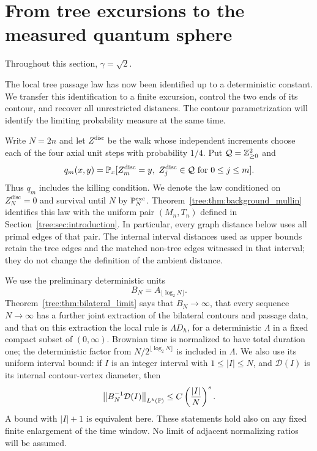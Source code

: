 \section{From tree excursions to the measured quantum sphere}
\label{tree:sec:sphere}

Throughout this section, $\gamma=\sqrt2$.

The local tree passage law has now been identified up to a deterministic
constant. We transfer this identification to a finite excursion, control
the two ends of its contour, and recover all unrestricted distances.
The contour parametrization will identify the limiting probability
measure at the same time.

Write $N=2n$ and let $Z^{\mathrm{disc}}$ be the walk whose independent
increments choose each of the four axial unit steps with probability
$1/4$.  Put $\mathcal Q=\mathbb Z_{\geq0}^2$ and
\[
 q_m(x,y)=\Prob_x[Z^{\mathrm{disc}}_m=y,\ Z^{\mathrm{disc}}_j\in\mathcal Q
                    \text{ for }0\leq j\leq m].
\]
Thus $q_m$ includes the killing condition.  We denote the law conditioned on
$Z^{\mathrm{disc}}_N=0$ and survival until $N$ by $\mathbb P_N^{\mathrm{exc}}$.
Theorem~\ref{tree:thm:background_mullin} identifies this law with the uniform pair
$(M_n,T_n)$ defined in Section~\ref{tree:sec:introduction}.  In particular,
every graph distance below uses all primal
edges of that pair.  The internal interval distances used as upper bounds
retain the tree edges and the matched non-tree edges witnessed in that
interval; they do not change the definition of the ambient distance.

We use the preliminary deterministic units
\begin{equation}\label{tree:eq:sphere_units}
 B_N=A_{\lfloor\log_2N\rfloor}.
\end{equation}
Theorem~\ref{tree:thm:bilateral_limit} says that $B_N\to\infty$, that every
sequence $N\to\infty$ has a further joint extraction of the bilateral
contours and passage data, and that on this extraction the local rule is
$\Lambda D_h$, for a deterministic $\Lambda$ in a fixed compact subset of
$(0,\infty)$.  Brownian time is normalized to have total duration one;
the deterministic factor from $N/2^{\lfloor\log_2N\rfloor}$ is included
in $\Lambda$.  We also use its uniform interval bound: if $I$ is an
integer interval with $1\leq |I|\leq N$, and $\mathcal D(I)$ is its
internal contour-vertex diameter, then
\begin{equation}\label{tree:eq:sphere_internal_bound}
 \big\|B_N^{-1}\mathcal D(I)\big\|_{L^k(\mathbb P)}
       \leq C\left(\frac{|I|}{N}\right)^s.
\end{equation}
A bound with $|I|+1$ is equivalent here.  These statements hold also on
any fixed finite enlargement of the time window.  No limit of adjacent
normalizing ratios will be assumed.

